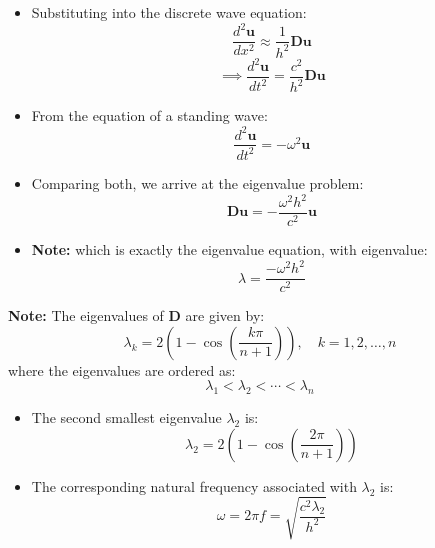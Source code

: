 \documentclass[aspectratio=169]{beamer}
\begin{document}
\begin{frame}

\begin{itemize}
    \item Substituting into the discrete wave equation:
    \[
    \frac{d^2 \mathbf{u}}{dx^2} \approx \frac{1}{h^2} \mathbf{D} \mathbf{u}
    \]
    \[
    \implies \frac{d^2 \mathbf{u}}{dt^2} = \frac{c^2}{h^2} \mathbf{D} \mathbf{u}
    \]

    \item From the equation of a standing wave:
    \[
    \frac{d^2 \mathbf{u}}{dt^2} = -\omega^2 \mathbf{u}
    \]

    \item Comparing both, we arrive at the eigenvalue problem:
    \[
    \mathbf{D} \mathbf{u} = -\frac{\omega^2 h^2}{c^2} \mathbf{u}
    \]

    \item \textbf{Note:} which is exactly the eigenvalue equation, with eigenvalue:
    \[
    \lambda = \frac{-\omega^2 h^2}{c^2}
    \]
\end{itemize}

\end{frame}


\begin{frame}

\textbf{Note:} The eigenvalues of \( \mathbf{D} \) are given by:
\[
\lambda_k = 2\left(1 - \cos\left(\frac{k \pi}{n+1}\right)\right), \quad k = 1, 2, \dots, n
\]
where the eigenvalues are ordered as:
\[
\lambda_1 < \lambda_2 < \cdots < \lambda_n
\]

\begin{itemize}
    \item The second smallest eigenvalue \( \lambda_2 \) is:
    \[
    \lambda_2 = 2\left(1 - \cos\left(\frac{2 \pi}{n+1}\right)\right)
    \]
    
    \item The corresponding natural frequency associated with \( \lambda_2 \) is:
    \[
    \omega = 2 \pi f = \sqrt{\frac{c^2 \lambda_2}{h^2}}
    \]
\end{itemize}

\end{frame}
\end{document}
